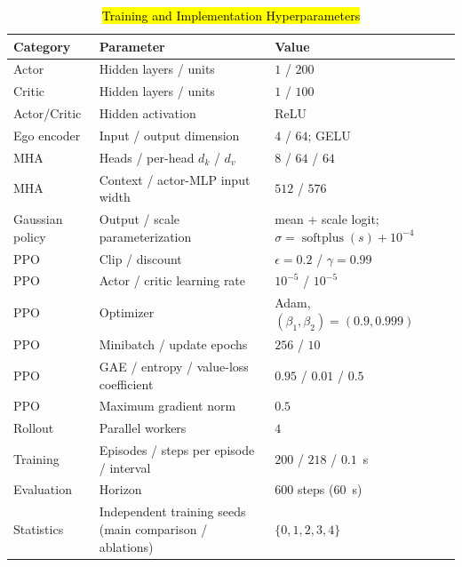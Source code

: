 \documentclass{ieeeaccess}
\begin{document}
\begin{table}[htbp]
\centering
\caption{\hl{Training and Implementation Hyperparameters}}
\label{tab:training_hyperparameters}
\renewcommand{\arraystretch}{1.12}
\begin{tabular}{|l|l|l|}
\hline
\rowcolor{yellow}\textbf{Category} & \textbf{Parameter} & \textbf{Value} \\ \hline
\rowcolor{yellow}Actor & Hidden layers / units & $1$ / $200$ \\ \hline %
\rowcolor{yellow}Critic & Hidden layers / units & $1$ / $100$ \\ \hline %
\rowcolor{yellow}Actor/Critic & Hidden activation & ReLU \\ \hline %
\rowcolor{yellow}Ego encoder & Input / output dimension & $4$ / $64$; GELU \\ \hline %
\rowcolor{yellow}MHA & Heads / per-head $d_k$ / $d_v$ & $8$ / $64$ / $64$ \\ \hline %
\rowcolor{yellow}MHA & Context / actor-MLP input width & $512$ / $576$ \\ \hline %
\rowcolor{yellow}Gaussian policy & Output / scale parameterization & mean + scale logit; $\sigma=\operatorname{softplus}(s)+10^{-4}$ \\ \hline %
\rowcolor{yellow}PPO & Clip / discount & $\epsilon=0.2$ / $\gamma=0.99$ \\ \hline %
\rowcolor{yellow}PPO & Actor / critic learning rate & $10^{-5}$ / $10^{-5}$ \\ \hline %
\rowcolor{yellow}PPO & Optimizer & Adam, $(\beta_1,\beta_2)=(0.9,0.999)$ \\ \hline %
\rowcolor{yellow}PPO & Minibatch / update epochs & $256$ / $10$ \\ \hline %
\rowcolor{yellow}PPO & GAE / entropy / value-loss coefficient & $0.95$ / $0.01$ / $0.5$ \\ \hline %
\rowcolor{yellow}PPO & Maximum gradient norm & $0.5$ \\ \hline %
\rowcolor{yellow}Rollout & Parallel workers & $4$ \\ \hline %
\rowcolor{yellow}Training & Episodes / steps per episode / interval & $200$ / $218$ / $0.1$~s \\ \hline %
\rowcolor{yellow}Evaluation & Horizon & $600$ steps ($60$~s) \\ \hline %
\rowcolor{yellow}Statistics & Independent training seeds (main comparison / ablations) & $\{0,1,2,3,4\}$ \\ \hline %

\end{tabular}
\end{table}
\end{document}
